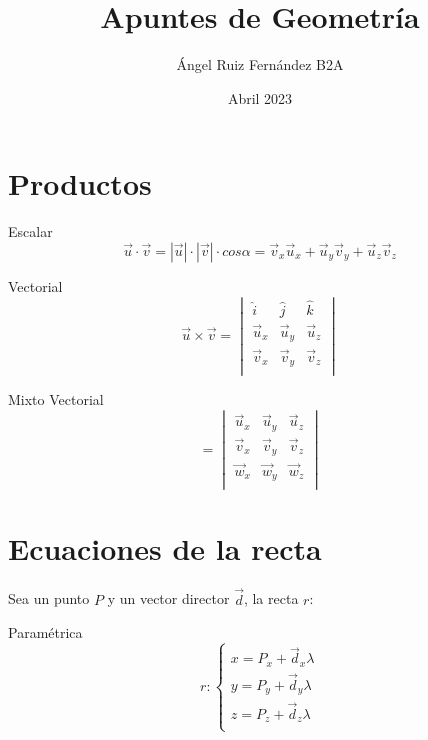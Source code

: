 \documentclass[12pt, letterpaper, twoside]{article}
\title{Apuntes de Geometría}
\author{Ángel Ruiz Fernández B2A}
\date{Abril 2023}
\begin{document}
	\maketitle
	
	\section{Productos}
	
	Escalar
	\begin{equation}
		\vec{u} \cdot \vec{v} = |\vec{u}| \cdot |\vec{v}| \cdot cos\alpha = \vec{v}_x \vec{u}_x + \vec{u}_y \vec{v}_y + \vec{u}_z \vec{v}_z
	\end{equation}

	Vectorial
	\begin{equation}
		\vec{u} \times \vec{v} = 
		\begin{vmatrix}
			\hat{i}   & \hat{j}   & \hat{k}   \\
			\vec{u}_x & \vec{u}_y & \vec{u}_z \\
			\vec{v}_x & \vec{v}_y & \vec{v}_z \\
		\end{vmatrix}
	\end{equation}

	Mixto
	Vectorial
	\begin{equation}
		[\vec{u}, \vec{v}, \vec{w}] = 
		\begin{vmatrix}
			\vec{u}_x & \vec{u}_y & \vec{u}_z \\
			\vec{v}_x & \vec{v}_y & \vec{v}_z \\
			\vec{w}_x & \vec{w}_y & \vec{w}_z \\
		\end{vmatrix}
	\end{equation}
	
	\section{Ecuaciones de la recta}
	
	Sea un punto $P$ y un vector director $\vec{d}$, la recta $r$:
	
	Paramétrica
	\begin{equation}
		r :
		\begin{cases}
			x = P_x + \vec{d}_x \lambda \\
			y = P_y + \vec{d}_y \lambda \\
			z = P_z + \vec{d}_z \lambda \\
		\end{cases}
	\end{equation}
\end{document}

